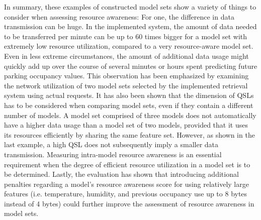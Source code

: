 In summary, these examples of constructed model sets show a variety of things to consider when assessing resource awareness: For one, the difference in data transmission can be huge. In the implemented system, the amount of data needed to be transferred per minute can be up to 60 times bigger for a model set with extremely low resource utilization, compared to a very resource-aware model set. Even in less extreme circumstances, the amount of additional data usage might quickly add up over the course of several minutes or hours spent predicting future parking occupancy values. This observation has been emphasized by examining the network utilization of two model sets selected by the implemented retrieval system using actual requests. It has also been shown that the dimension of QSLs has to be considered when comparing model sets, even if they contain a different number of models. A model set comprised of three models does not automatically have a higher data usage than a model set of two models, provided that it uses its resources efficiently by sharing the same feature set. However, as shown in the last example, a high QSL does not subsequently imply a smaller data transmission. Measuring intra-model resource awareness is an essential requirement when the degree of efficient resource utilization in a model set is to be determined. Lastly, the evaluation has shown that introducing additional penalties regarding a model's resource awareness score for using relatively large features (i.e. temperature, humidity, and previous occupancy use up to 8 bytes instead of 4 bytes) could further improve the assessment of resource awareness in model sets. 
